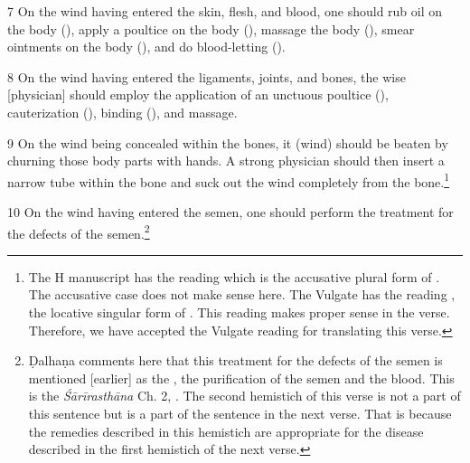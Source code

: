 \begin{translation}
    \item [7]
    On the wind having entered the skin, flesh, and blood, one should rub oil on the body (), apply a poultice on the body (), massage the body (), smear ointments on the body (), and do blood-letting (). 

    \item[8]
    On the wind having entered the ligaments, joints, and bones, the wise [physician] should employ the application of an unctuous poultice (), cauterization (), binding (), and massage.

    \item [9]
    On the wind being concealed within the bones, it (wind) should be beaten by churning those body parts with hands. A strong physician should then insert a narrow tube within the bone and suck out the wind completely from the bone.\footnote{The H manuscript has the reading  which is the accusative plural form of . The accusative case does not make sense here.  The Vulgate has the reading , the locative singular form of . This reading makes proper sense in the verse. Therefore, we have accepted the Vulgate reading  for translating this verse.} 

    \item[10]
    On the wind having entered the semen, one should perform the treatment for the defects of the semen.\footnote{Ḍalhaṇa comments here that this treatment for the defects of the semen is mentioned [earlier] as the , the purification of the semen and the blood. This is the \emph{Śārīrasthāna} Ch. 2, . The second hemistich of this verse is not a part of this sentence but is a part of the sentence in the next verse. That is because the remedies described in this hemistich are appropriate for the disease described in the first hemistich of the next verse.}


\end{translation}
